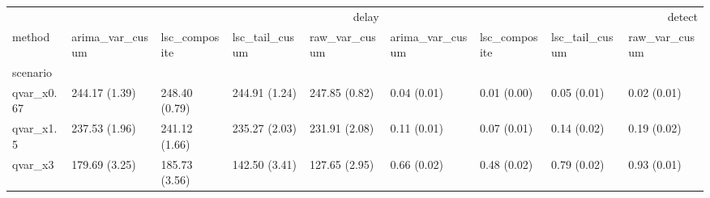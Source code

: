 \begin{tabular}{lllllllll}
\toprule
 & \multicolumn{4}{r}{delay} & \multicolumn{4}{r}{detect} \\
method & arima_var_cusum & lsc_composite & lsc_tail_cusum & raw_var_cusum & arima_var_cusum & lsc_composite & lsc_tail_cusum & raw_var_cusum \\
scenario &  &  &  &  &  &  &  &  \\
\midrule
qvar_x0.67 & 244.17 (1.39) & 248.40 (0.79) & 244.91 (1.24) & 247.85 (0.82) & 0.04 (0.01) & 0.01 (0.00) & 0.05 (0.01) & 0.02 (0.01) \\
qvar_x1.5 & 237.53 (1.96) & 241.12 (1.66) & 235.27 (2.03) & 231.91 (2.08) & 0.11 (0.01) & 0.07 (0.01) & 0.14 (0.02) & 0.19 (0.02) \\
qvar_x3 & 179.69 (3.25) & 185.73 (3.56) & 142.50 (3.41) & 127.65 (2.95) & 0.66 (0.02) & 0.48 (0.02) & 0.79 (0.02) & 0.93 (0.01) \\
\bottomrule
\end{tabular}
